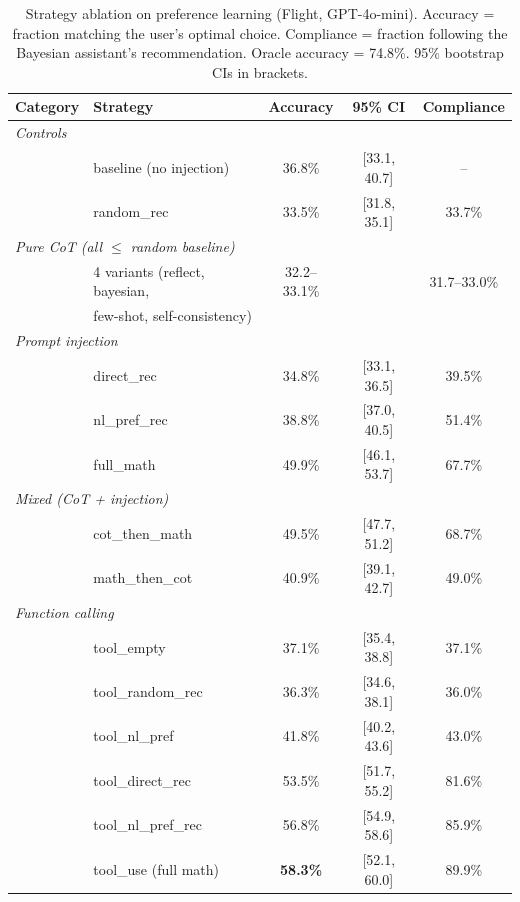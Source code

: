 \documentclass{article}
\begin{document}
\begin{table}[ht]
\centering
\small
\caption{Strategy ablation on preference learning (Flight, GPT-4o-mini). Accuracy = fraction matching the user's optimal choice. Compliance = fraction following the Bayesian assistant's recommendation. Oracle accuracy = 74.8\%. 95\% bootstrap CIs in brackets.}
\label{tab:strategy_full}
\begin{tabular}{@{}llccc@{}}
\toprule
Category & Strategy & Accuracy & 95\% CI & Compliance \\
\midrule
\multicolumn{5}{l}{\textit{Controls}} \\
& baseline (no injection) & 36.8\% & [33.1, 40.7] & -- \\
& random\_rec & 33.5\% & [31.8, 35.1] & 33.7\% \\
\midrule
\multicolumn{5}{l}{\textit{Pure CoT (all $\leq$ random baseline)}} \\
& 4 variants (reflect, bayesian, & 32.2--33.1\% & & 31.7--33.0\% \\
& \quad few-shot, self-consistency) & & & \\
\midrule
\multicolumn{5}{l}{\textit{Prompt injection}} \\
& direct\_rec & 34.8\% & [33.1, 36.5] & 39.5\% \\
& nl\_pref\_rec & 38.8\% & [37.0, 40.5] & 51.4\% \\
& full\_math & 49.9\% & [46.1, 53.7] & 67.7\% \\
\midrule
\multicolumn{5}{l}{\textit{Mixed (CoT + injection)}} \\
& cot\_then\_math & 49.5\% & [47.7, 51.2] & 68.7\% \\
& math\_then\_cot & 40.9\% & [39.1, 42.7] & 49.0\% \\
\midrule
\multicolumn{5}{l}{\textit{Function calling}} \\
& tool\_empty & 37.1\% & [35.4, 38.8] & 37.1\% \\
& tool\_random\_rec & 36.3\% & [34.6, 38.1] & 36.0\% \\
& tool\_nl\_pref & 41.8\% & [40.2, 43.6] & 43.0\% \\
& tool\_direct\_rec & 53.5\% & [51.7, 55.2] & 81.6\% \\
& tool\_nl\_pref\_rec & 56.8\% & [54.9, 58.6] & 85.9\% \\
& tool\_use (full math) & \textbf{58.3\%} & [52.1, 60.0] & 89.9\% \\
\bottomrule
\end{tabular}
\end{table}
\end{document}

